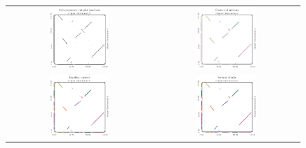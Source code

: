 \begin{figure}[p]
\mySfFamily
\centering
\begin{tabular}{c @{\hskip 2em} c}
\includegraphics[width = 0.43\textwidth]{images/rearrangements/synteny_blocks-1} & \includegraphics[width = 0.43\textwidth]{images/rearrangements/synteny_blocks-2}\\[3ex]
\includegraphics[width = 0.43\textwidth]{images/rearrangements/synteny_blocks-3} & \includegraphics[width = 0.43\textwidth]{images/rearrangements/synteny_blocks-4}\\[3ex]

\end{tabular}
\end{figure}
